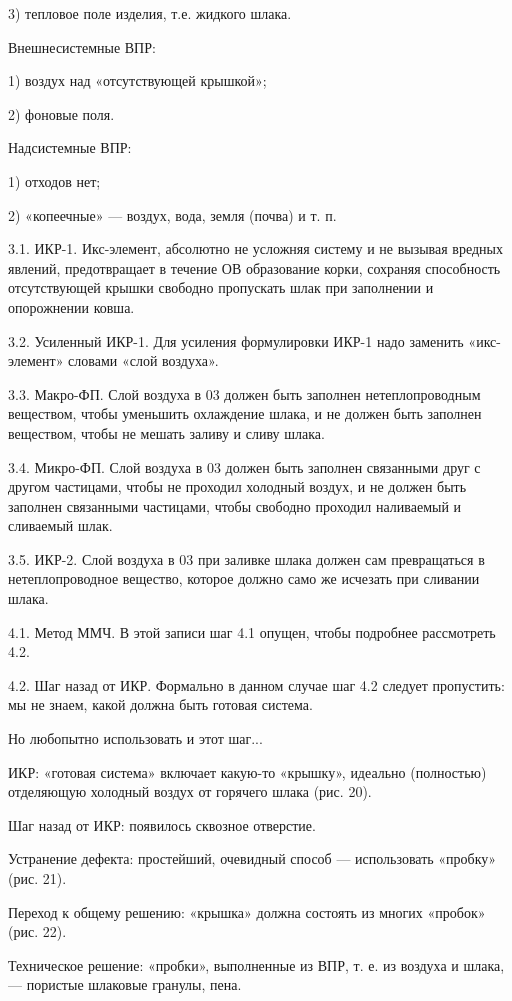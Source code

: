 3) тепловое поле изделия, т.е. жидкого шлака.

Внешнесистемные ВПР:

1) воздух над «отсутствующей крышкой»;

2) фоновые поля.

Надсистемные ВПР:

1) отходов нет;

2) «копеечные» — воздух, вода, земля (почва) и т. п.

3.1. ИКР-1.  Икс-элемент, абсолютно не  усложняя систему и  не вызывая
вредных  явлений,  предотвращает  в   течение  ОВ  образование  корки,
сохраняя способность отсутствующей крышки свободно пропускать шлак при
заполнении и опорожнении ковша.

3.2. Усиленный  ИКР-1. Для  усиления формулировки ИКР-1  надо заменить
«икс-элемент» словами «слой воздуха».

3.3. Макро-ФП. Слой воздуха в 03 должен быть заполнен нетеплопроводным
веществом, чтобы уменьшить охлаждение шлака, и не должен быть заполнен
веществом, чтобы не мешать заливу и сливу шлака.

3.4. Микро-ФП. Слой воздуха в  03 должен быть заполнен связанными друг
с другом  частицами, чтобы  не проходил холодный  воздух, и  не должен
быть заполнен связанными частицами, чтобы свободно проходил наливаемый
и сливаемый шлак.

3.5.  ИКР-2.  Слой   воздуха  в  03  при  заливке   шлака  должен  сам
превращаться  в  нетеплопроводное  вещество, которое  должно  само  же
исчезать при сливании шлака.

4.1.  Метод  ММЧ.  В  этой  записи шаг  4.1  опущен,  чтобы  подробнее
рассмотреть 4.2.

4.2.  Шаг назад  от ИКР.  Формально в  данном случае  шаг 4.2  следует
пропустить: мы не знаем, какой должна быть готовая система.

Но любопытно использовать и этот шаг...

ИКР:   «готовая   система»   включает  какую-то   «крышку»,   идеально
(полностью) отделяющую холодный воздух от горячего шлака (рис. 20).


Шаг назад от ИКР: появилось сквозное отверстие.

Устранение  дефекта:  простейший,   очевидный  способ  —  использовать
«пробку» (рис. 21).

Переход к общему решению: «крышка» должна состоять из
многих «пробок» (рис. 22).

Техническое решение: «пробки», выполненные из ВПР, т. е. из
воздуха и шлака, — пористые шлаковые гранулы, пена.

